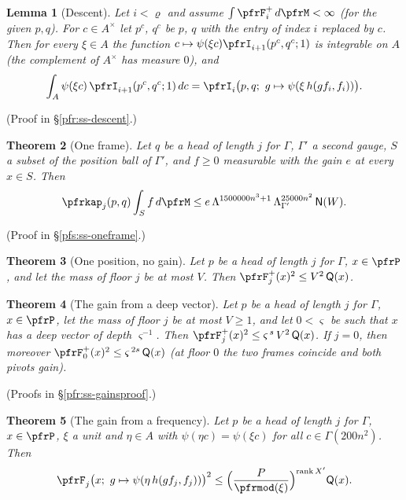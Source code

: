 \documentclass[10pt]{amsart}
\newtheorem{theorem}{Theorem}[section]
\newtheorem{lemma}[theorem]{Lemma}
\theoremstyle{definition}
\theoremstyle{remark}
\begin{document}
\begin{lemma}[Descent]\label{pfr:descent}
Let $i<\varrho$ and assume $\int\pfrF^+_i\,d\pfrM<\infty$ (for the given $p,q$). For $c\in A^\times$ let
$p^c$, $q^c$ be $p$, $q$ with the entry of index $i$ replaced by $c$. Then for every $\xi\in A$ the
function $c\mapsto\psi(\xi c)\pfrI_{i+1}(p^c,q^c;1)$ is integrable on $A$ (the complement of $A^\times$
has measure $0$), and
\[
\int_A\psi(\xi c)\,\pfrI_{i+1}(p^c,q^c;1)\,dc=\pfrI_i\bigl(p,q;\ g\mapsto\psi(\xi\,h(gf_i,f_i))\bigr).
\]
\end{lemma}
(Proof in \S\ref{pfr:ss-descent}.)

\begin{theorem}[One frame]\label{pfr:oneframe}
Let $q$ be a head of length $j$ for $\Gamma$, $\Gamma'$ a second gauge, $S$ a subset of the position
ball of $\Gamma'$, and $f\ge0$ measurable with the gain $e$ at every $x\in S$. Then
\[
\pfrkap_j(p,q)\int_Sf\,d\pfrM\le e\,\Lambda^{1500000n^3+1}\,\Lambda_{\Gamma'}^{25000n^2}\,\mathsf N(W).
\]
\end{theorem}
(Proof in \S\ref{pfs:ss-oneframe}.)

\begin{theorem}[One position, no gain]\label{pfr:nogain}
Let $p$ be a head of length $j$ for $\Gamma$, $x\in\pfrP$, and let the mass of floor $j$ be at most $V$.
Then $\pfrF^+_j(x)^2\le V^2\,\mathsf Q(x)$.
\end{theorem}

\begin{theorem}[The gain from a deep vector]\label{pfr:deep}
Let $p$ be a head of length $j$ for $\Gamma$, $x\in\pfrP$, let the mass of floor $j$ be at most $V\ge1$,
and let $0<\varsigma$ be such that $x$ has a deep vector of depth $\varsigma^{-1}$. Then
$\pfrF^+_j(x)^2\le\varsigma^{\,s}\,V^2\,\mathsf Q(x)$. If $j=0$, then moreover
$\pfrF^+_0(x)^2\le\varsigma^{\,2s}\,\mathsf Q(x)$ (at floor $0$ the two frames coincide and both pivots gain).
\end{theorem}
(Proofs in \S\ref{pfr:ss-gainsproof}.)

\begin{theorem}[The gain from a frequency]\label{pfr:gain-char}
Let $p$ be a head of length $j$ for $\Gamma$, $x\in\pfrP$, $\xi$ a unit and $\eta\in A$ with
$\psi(\eta c)=\psi(\xi c)$ for all $c\in\Gamma(200n^2)$. Then
\[
\pfrF_j\bigl(x;\ g\mapsto\psi(\eta\,h(gf_j,f_j))\bigr)^2\le\Bigl(\frac{P}{\pfrmod(\xi)}\Bigr)^{\operatorname{rank}X'}
\mathsf Q(x).
\]
\end{theorem}
\end{document}
